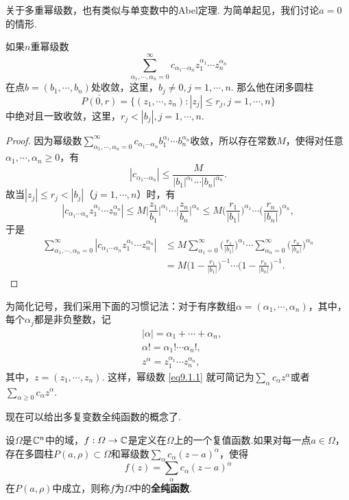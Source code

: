 关于多重幂级数，也有类似与单变数中的Abel定理. 为简单起见，我们讨论$a=0$的情形.
\begin{prop}\label{prop9.1.1}
如果$n$重幂级数
\begin{equation}\label{eq9.1.1}
\sum_{\alpha_1,\cdots,\alpha_n=0}^\infty c_{\alpha_1\cdots\alpha_n}z_1^{\alpha_1}
\cdots z_n^{\alpha_n}
\end{equation}
在点$b=(b_1,\cdots,b_n)$处收敛，这里，$b_j\ne0,j=1,\cdots,n$. 那么他在闭多圆柱
\[\bar{P(0,r)}=\{(z_1,\cdots,z_n):|z_j|\le r_j,j=1,\cdots,n\}\]
中绝对且一致收敛，这里，$r_j<|b_j|,j=1,\cdots,n$.
\end{prop}
\begin{proof}
因为幂级数$\sum_{\alpha_1,\cdots,\alpha_n=0}^\infty c_{\alpha_1\cdots\alpha_n}b_1^{\alpha_1}
\cdots b_n^{\alpha_n}$收敛，所以存在常数$M$，使得对任意$\alpha_1,\cdots,\alpha_n\ge0$，有
\[|c_{\alpha_1\cdots\alpha_n}|\le\frac M{|b_1|^{\alpha_1}\cdots|b_n|^{\alpha_n}}.\]
故当$|z_j|\le r_j<|b_j|$（$j=1,\cdots,n$）时，有
\[|c_{\alpha_1\cdots\alpha_n}z_1^{\alpha_1}
\cdots z_n^{\alpha_n}|\le M\bigg|\frac{z_1}{b_1}\bigg|^{\alpha_1}\cdots
\bigg|\frac{z_n}{b_n}\bigg|^{\alpha_n}
\le M\bigg(\frac{r_1}{|b_1|}\bigg)^{\alpha_1}\cdots
\bigg(\frac{r_n}{|b_n|}\bigg)^{\alpha_n},\]
于是
\begin{align*}
\sum_{\alpha_1,\cdots,\alpha_n=0}^\infty |c_{\alpha_1\cdots\alpha_n}z_1^{\alpha_1}
\cdots z_n^{\alpha_n}|&\le M\sum_{\alpha_1=0}^\infty \bigg(\frac{r_1}{|b_1|}\bigg)^{\alpha_1}\cdots\sum_{\alpha_n=0}^\infty
\bigg(\frac{r_n}{|b_n|}\bigg)^{\alpha_n}\\
&=M\bigg(1-\frac{r_1}{|b_1|}\bigg)^{-1}\cdots\bigg(1-\frac{r_n}{|b_n|}\bigg)^{-1}.
\end{align*}
\end{proof}

为简化记号，我们采用下面的习惯记法：对于有序数组$\alpha=(\alpha_1,\cdots,\alpha_n)$，其中，每个$\alpha_j$都是非负整数，记
\begin{align*}
&|\alpha|=\alpha_1+\cdots+\alpha_n,\\
&\alpha!=\alpha_1!\cdots\alpha_n!,\\
&z^\alpha=z_1^{\alpha_1}\cdots z_n^{\alpha_n},
\end{align*}
其中，$z=(z_1,\cdots,z_n)$. 这样，幂级数 \eqref{eq9.1.1} 就可简记为$\sum_\alpha c_\alpha z^\alpha$或者$\sum_{\alpha\ge0}c_\alpha z^\alpha$.

现在可以给出多复变数全纯函数的概念了.
\begin{definition}\label{def9.1.2}
设$\Omega$是$\mathbb C^n$中的域，$f:\varOmega\to \mathbb C$是定义在$\Omega$上的一个复值函数.如果对每一点$a\in\Omega$，存在多圆柱$P(a,\rho)\subset\Omega$和幂级数$\sum_\alpha c_\alpha(z-a)^\alpha$，使得
\begin{equation}\label{eq9.1.2}
f(z)=\sum_\alpha c_\alpha(z-a)^\alpha
\end{equation}
在$P(a,\rho)$中成立，则称$f$为$\Omega$中的\textbf{全纯函数}.
\end{definition}

